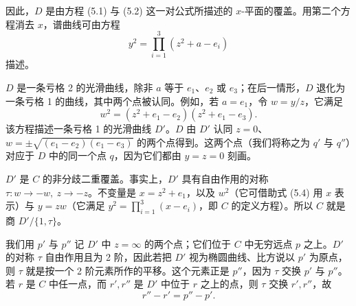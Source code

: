 

因此，$D$ 是由方程 (5.1) 与 (5.2) 这一对公式所描述的 $x$-平面的覆盖。用第二个方程消去 $x$，谱曲线可由方程
\begin{equation}\tag{5.3}
y^2 = \prod_{i=1}^{3}(z^2+a-e_i)
\end{equation}
描述。

$D$ 是一条亏格 2 的光滑曲线，除非 $a$ 等于 $e_1$、$e_2$ 或 $e_3$；在后一情形，$D$ 退化为一条亏格 1 的曲线，其中两个点被认同。例如，若 $a=e_1$，令 $w=y/z$，它满足
\begin{equation}\tag{5.4}
w^2 = (z^2+e_1-e_2)(z^2+e_1-e_3).
\end{equation}
该方程描述一条亏格 1 的光滑曲线 $D'$。$D$ 由 $D'$ 认同 $z=0$、$w=\pm\sqrt{(e_1-e_2)(e_1-e_3)}$ 的两个点得到。这两个点（我们将称之为 $q'$ 与 $q''$）对应于 $D$ 中的同一个点 $q$，因为它们都由 $y=z=0$ 刻画。


$D'$ 是 $C$ 的非分歧二重覆盖。事实上，$D'$ 具有自由作用的对称 $\tau: w\to -w,\ z\to -z$。不变量是 $x=z^2+e_1$，以及 $w^2$（它可借助式 (5.4) 用 $x$ 表示）与 $y=zw$（它满足 $y^2=\prod_{i=1}^{3}(x-e_i)$，即 $C$ 的定义方程）。所以 $C$ 就是商 $D'/\{1,\tau\}$。

我们用 $p'$ 与 $p''$ 记 $D'$ 中 $z=\infty$ 的两个点；它们位于 $C$ 中无穷远点 $p$ 之上。$D'$ 的对称 $\tau$ 自由作用且为 2 阶，因此若把 $D'$ 视为椭圆曲线、比方说以 $p'$ 为原点，则 $\tau$ 就是按一个 2 阶元素所作的平移。这个元素正是 $p''$，因为 $\tau$ 交换 $p'$ 与 $p''$。若 $r$ 是 $C$ 中任一点，而 $r',r''$ 是 $D'$ 中位于 $r$ 之上的点，则 $\tau$ 交换 $r',r''$，故
\begin{equation}\tag{5.5}
r'' - r' = p'' - p'.
\end{equation}

